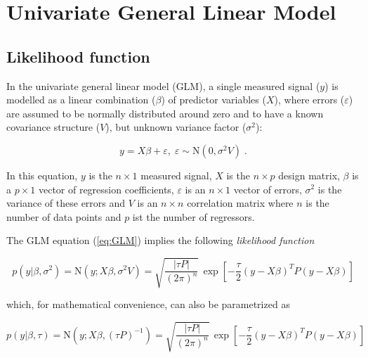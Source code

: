 

\setcounter{equation}{0}
\section{Univariate General Linear Model} \label{sec:GLM}

\subsection{Likelihood function} \label{sec:GLM-LF}

In the univariate general linear model (GLM), a single measured signal ($y$) is modelled as a linear combination ($\beta$) of predictor variables ($X$), where errors ($\varepsilon$) are assumed to be normally distributed around zero and to have a known covariance structure ($V$), but unknown variance factor ($\sigma^2$):

\begin{equation} \label{eq:GLM}
y = X \beta + \varepsilon, \; \varepsilon \sim \mathrm{N}(0, \sigma^2 V) \; .
\end{equation}

In this equation, $y$ is the $n \times 1$ measured signal, $X$ is the $n \times p$ design matrix, $\beta$ is a $p \times 1$ vector of regression coefficients, $\varepsilon$ is an $n \times 1$ vector of errors, $\sigma^2$ is the variance of these errors and $V$ is an $n \times n$ correlation matrix where $n$ is the number of data points and $p$ ist the number of regressors.

The GLM equation (\ref{eq:GLM}) implies the following \textit{likelihood function}

\begin{equation} \label{eq:GLM-LF-class}
p(y|\beta,\sigma^2) = \mathrm{N}(y; X \beta, \sigma^2 V) = \sqrt{\frac{|\tau P|}{(2 \pi)^n}} \, \exp\left[ -\frac{\tau}{2} (y-X\beta)^T P (y-X\beta) \right]
\end{equation}

which, for mathematical convenience, can also be parametrized as

\begin{equation} \label{eq:GLM-LF-Bayes}
p(y|\beta,\tau) = \mathrm{N}(y; X \beta, (\tau P)^{-1}) = \sqrt{\frac{|\tau P|}{(2 \pi)^n}} \, \exp\left[ -\frac{\tau}{2} (y-X\beta)^T P (y-X\beta) \right]
\end{equation}

